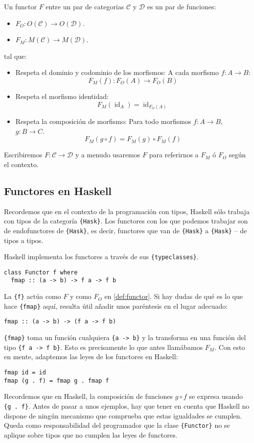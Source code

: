 \documentclass[12pt, twoside]{book}
\newcommand{\code}[1]{\Verb+{#1}+}
\newcommand{\cat}{{\mathcal{C}}}
\DeclareMathOperator{\id}{id}
\begin{document}
\begin{definition}\label{def:functor}
Un functor $F$ entre un par de categorias $\cat$ y $\mathcal{D}$ es un par de funciones:
\begin{itemize}
\item $F_O : O(\cat) \to O(\mathcal{D})$.
\item $F_M : M(\cat) \to M(\mathcal{D})$.
\end{itemize}
tal que:
\begin{itemize}
\item Respeta el dominio y codominio de los morfismos: A cada morfismo $f : A \to B$:
\[ F_M(f) : F_O(A) \to F_O(B) \]
\item Respeta el morfismo identidad:
\[ F_M(\id_A) = \id_{F_O(A)} \]
\item Respeta la composición de morfismo: Para todo morfismos $f : A \to B$, $g : B \to C$.
\[ F_M(g \circ f) = F_M(g) \circ F_M(f) \]
\end{itemize}
\end{definition}

Escribiremos $F \colon \cat \to \mathcal{D}$ y a menudo usaremos $F$ para referirnos a $F_M$ ó $F_O$ según el contexto.

\subsection{Functores en Haskell}
Recordemos que en el contexto de la programación con tipos, Haskell sólo trabaja con tipos de la categoría \code{Hask}.
Los functores con los que podemos trabajar son de endofunctores de \code{Hask}, es decir, functores que van de \code{Hask} a \code{Hask} -- de tipos a tipos.

Haskell implementa los functores a través de sus \code{typeclasses}.
\begin{verbatim}
class Functor f where
  fmap :: (a -> b) -> f a -> f b
\end{verbatim}

La \code{f} actúa como $F$ y como $F_O$ en \ref{def:functor}.
Si hay dudas de qué es lo que hace \code{fmap} aquí, resulta útil añadir unos paréntesis en el lugar adecuado:

\begin{verbatim}
fmap :: (a -> b) -> (f a -> f b)
\end{verbatim}

\code{fmap} toma un función cualquiera \code{a -> b} y la transforma en una función del tipo \code{f a -> f b}.
Esto es precisamente lo que antes llamábamos $F_M$.
Con esto en mente, adaptemos las leyes de los functores en Haskell:
\begin{verbatim}
fmap id = id
fmap (g . f) = fmap g . fmap f
\end{verbatim}
Recordemos que en Haskell, la composición de funciones $g \circ f$ se expresa usando \code{g . f}.
Antes de pasar a unos ejemplos, hay que tener en cuenta que Haskell no dispone de ningún mecanismo que comprueba que estas igualdades se cumplen.
Queda como responsabilidad del programador que la clase \code{Functor} no se aplique sobre tipos que no cumplen las leyes de functores. 
\end{document}
